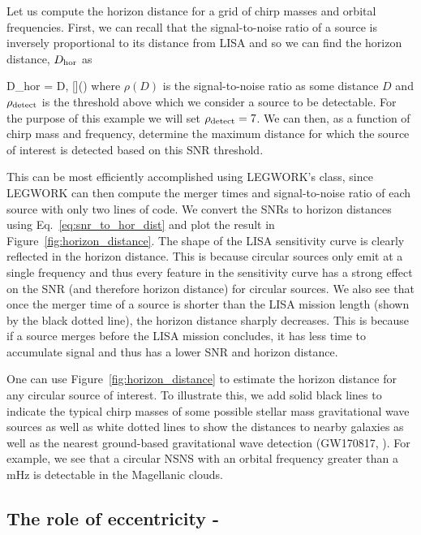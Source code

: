 \documentclass[twocolumn, linenumbers]{aastex631}
\newcommand{\lw}{LEGWORK}
\newcommand{\lwColour}{SeaGreen}
\newcommand{\docsIcon}{{\color{\lwColour}{\faFileCode}}}
\newcommand{\docsLink}[1]{\href{#1}{\docsIcon}}
\newcommand{\tutorialIcon}{{\color{\lwColour}{\faLaptopCode}}}
\newcommand{\tutorialLink}[1]{\href{#1}{\tutorialIcon}}
\renewenvironment{equation}[1]{%
    \ifstrempty{#1}{%
        \renewtagform{eqtag}[]{(}{)}%
    }{%
        \renewtagform{eqtag}[]{\docsLink{#1}\,(}{)}%
    }%
    \usetagform{eqtag}%
    \align%
    }{%
    \endalign%
    \renewtagform{eqtag}[]{(}{)}%
    \usetagform{eqtag}%
}
\begin{document}
Let us compute the horizon distance for a grid of chirp masses and orbital frequencies. First, we can recall that the signal-to-noise ratio of a source is inversely proportional to its distance from LISA and so we can find the horizon distance, $D_{\rm hor}$ as
\begin{equation}{}
    \label{eq:snr_to_hor_dist}
    D_{\rm hor} =  \cdot D,
\end{equation}
where $\rho(D)$ is the signal-to-noise ratio as some distance $D$ and $\rho_{\rm detect}$ is the threshold above which we consider a source to be detectable. For the purpose of this example we will set $\rho_{\rm detect} = 7$. We can then, as a function of chirp mass and frequency, determine the maximum distance for which the source of interest is detected based on this SNR threshold.

This can be most efficiently accomplished using \lw{}'s \href{https://legwork.readthedocs.io/en/latest/api/legwork.source.Source}{\color{\lwColour}{\texttt{Source}}} class, since \lw{} can then compute the merger times and signal-to-noise ratio of each source with only two lines of code. We convert the SNRs to horizon distances using Eq.~\ref{eq:snr_to_hor_dist} and plot the result in Figure~\ref{fig:horizon_distance}. The shape of the LISA sensitivity curve is clearly reflected in the horizon distance. This is because circular sources only emit at a single frequency and thus every feature in the sensitivity curve has a strong effect on the SNR (and therefore horizon distance) for circular sources. We also see that once the merger time of a source is shorter than the LISA mission length (shown by the black dotted line), the horizon distance sharply decreases. This is because if a source merges before the LISA mission concludes, it has less time to accumulate signal and thus has a lower SNR and horizon distance.

One can use Figure~\ref{fig:horizon_distance} to estimate the horizon distance for any circular source of interest. To illustrate this, we add solid black lines to indicate the typical chirp masses of some possible stellar mass gravitational wave sources as well as white dotted lines to show the distances to nearby galaxies as well as the nearest ground-based gravitational wave detection (GW170817, \citealp{Abbott+2017_GW170817}). For example, we see that a circular NSNS with an orbital frequency greater than a mHz is detectable in the Magellanic clouds.

\subsection{The role of eccentricity\texorpdfstring{ - \tutorialLink{https://legwork.readthedocs.io/en/latest/demos/TheRoleofEccentricity.html}}{}}\label{sec:eccentricity_role}
\end{document}
